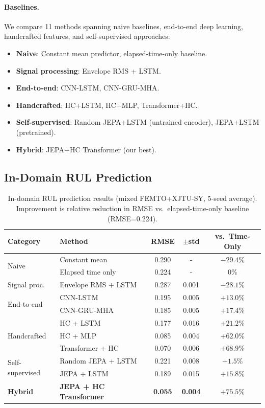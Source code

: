 \paragraph{Baselines.} We compare 11 methods spanning naive baselines, end-to-end deep learning, handcrafted features, and self-supervised approaches:
\begin{itemize}[nosep]
  \item \textbf{Naive}: Constant mean predictor, elapsed-time-only baseline.
  \item \textbf{Signal processing}: Envelope RMS + LSTM.
  \item \textbf{End-to-end}: CNN-LSTM, CNN-GRU-MHA.
  \item \textbf{Handcrafted}: HC+LSTM, HC+MLP, Transformer+HC.
  \item \textbf{Self-supervised}: Random JEPA+LSTM (untrained encoder), JEPA+LSTM (pretrained).
  \item \textbf{Hybrid}: JEPA+HC Transformer (our best).
\end{itemize}

\subsection{In-Domain RUL Prediction}
\label{sec:indomain}

\begin{table}[t]
\centering
\caption{In-domain RUL prediction results (mixed FEMTO+XJTU-SY, 5-seed average). Improvement is relative reduction in RMSE vs.\ elapsed-time-only baseline (RMSE=0.224).}
\label{tab:main_results}
\small
\begin{tabular}{@{}llccc@{}}
\toprule
Category & Method & RMSE & $\pm$std & vs.\ Time-Only \\
\midrule
\multirow{2}{*}{Naive} & Constant mean & 0.290 &  -  & $-29.4\%$ \\
& Elapsed time only & 0.224 &  -  & 0\% \\
\midrule
Signal proc. & Envelope RMS + LSTM & 0.287 & 0.001 & $-28.1\%$ \\
\midrule
\multirow{2}{*}{End-to-end} & CNN-LSTM & 0.195 & 0.005 & $+13.0\%$ \\
& CNN-GRU-MHA & 0.185 & 0.005 & $+17.4\%$ \\
\midrule
\multirow{3}{*}{Handcrafted} & HC + LSTM & 0.177 & 0.016 & $+21.2\%$ \\
& HC + MLP & 0.085 & 0.004 & $+62.0\%$ \\
& Transformer + HC & 0.070 & 0.006 & $+68.9\%$ \\
\midrule
\multirow{2}{*}{Self-supervised} & Random JEPA + LSTM & 0.221 & 0.008 & $+1.5\%$ \\
& JEPA + LSTM & 0.189 & 0.015 & $+15.8\%$ \\
\midrule
\textbf{Hybrid} & \textbf{JEPA + HC Transformer} & \textbf{0.055} & \textbf{0.004} & $\mathbf{+75.5\%}$ \\
\bottomrule
\end{tabular}
\end{table}

